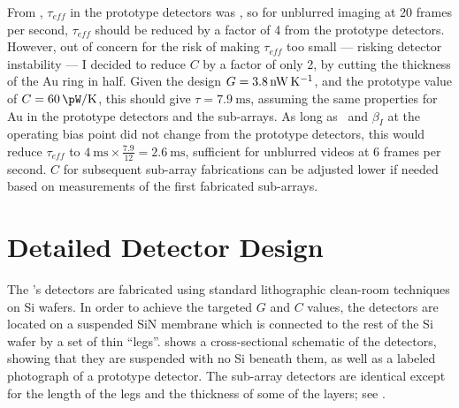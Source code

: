 From , $\tau_{eff}$ in the prototype detectors was , so for unblurred imaging at 20 frames per second, $\tau_{eff}$ should be reduced by a factor of 4 from the prototype detectors.
However, out of concern for the risk of making $\tau_{eff}$ too small --- risking detector instability --- I decided to reduce $C$ by a factor of only 2, by cutting the thickness of the Au ring in half.
Given the design $G = \SI{3.8}{\nW\per\K}$, and the prototype value of $C = \SI{60}{\pW\per\K}$, this should give $\tau = \SI{7.9}{\ms}$, assuming the same properties for Au in the prototype detectors and the sub-arrays. 
As long as \Loop\ and $\beta_I$ at the operating bias point did not change from the prototype detectors, this would reduce $\tau_{eff}$ to $\SI{4}{\ms} \times \frac{7.9}{12} = \SI{2.6}{\ms}$, sufficient for unblurred videos at 6 frames per second.
$C$ for subsequent sub-array fabrications can be adjusted lower if needed based on measurements of the first fabricated sub-arrays.

\section{Detailed Detector Design} \label{sec:ch5-det-design}

The \Imager's detectors are fabricated using standard lithographic clean-room techniques on Si wafers.
In order to achieve the targeted $G$ and $C$ values, the detectors are located on a suspended SiN membrane which is connected to the rest of the Si wafer by a set of thin ``legs''.
 shows a cross-sectional schematic of the detectors, showing that they are suspended with no Si beneath them, as well as a labeled photograph of a prototype detector.
The sub-array detectors are identical except for the length of the legs and the thickness of some of the layers; see .

